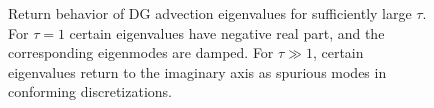 \documentclass[preprint,10pt]{elsarticle}
\begin{document}
\begin{figure}
\caption{Return behavior of DG advection eigenvalues for sufficiently large $\tau$.  For $\tau = 1$ certain eigenvalues have negative real part, and the corresponding eigenmodes are damped.  For $\tau \gg 1$, certain eigenvalues return to the imaginary axis as spurious modes in conforming discretizations. }
\label{fig:spurious}
\end{figure}
\end{document}
